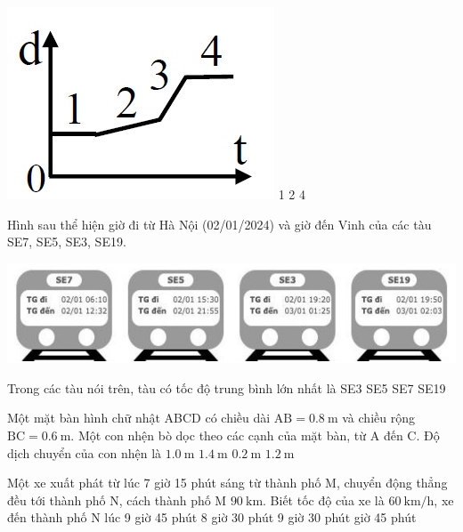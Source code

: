 \begin{ex}
{\includegraphics[width=0.35\linewidth]{../figs/D10-2-11}}
	\choice
	{1}
	{2}
	{}
	{4}
	\loigiai{}
\end{ex}
\begin{ex}
	Hình sau thể hiện giờ đi từ Hà Nội (02/01/2024) và giờ đến Vinh của các tàu SE7, SE5, SE3, SE19.
	\begin{center}
		\includegraphics[width=0.7\linewidth]{../figs/D10-2-12}
	\end{center}
	Trong các tàu nói trên, tàu có tốc độ trung bình lớn nhất là
	\choice
	{\True SE3}
	{SE5}
	{SE7}
	{SE19}
	\loigiai{}
\end{ex}
\begin{ex}
	Một mặt bàn hình chữ nhật ABCD có chiều dài $\mathrm{AB}=\SI{0.8}{\meter}$ và chiều rộng $\mathrm{BC}=\SI{0.6}{\meter}$. Một con nhện bò dọc theo các cạnh của mặt bàn, từ A đến C. Độ dịch chuyển của con nhện là
	\choice
	{\True $\SI{1.0}{\meter}$}
	{$\SI{1.4}{\meter}$}
	{$\SI{0.2}{\meter}$}
	{$\SI{1.2}{\meter}$}
	\loigiai{}
\end{ex}
\begin{ex}
	Một xe xuất phát từ lúc 7 giờ 15 phút sáng từ thành phố M, chuyển động thẳng đều tới thành phố N, cách thành phố M $\SI{90}{\kilo\meter}$. Biết tốc độ của xe là $\SI{60}{\kilo\meter/\hour}$, xe đến thành phố N lúc	
	\choice
	{9 giờ 45 phút}
	{8 giờ 30 phút}
	{9 giờ 30 phút}
	{ giờ 45 phút}
\end{ex}

